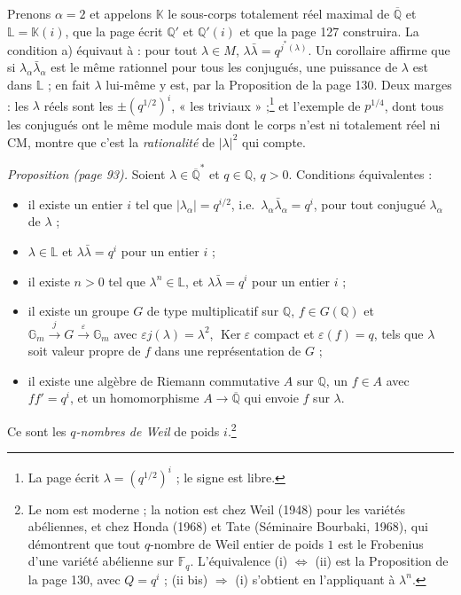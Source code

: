 \documentclass[11pt,a4paper]{article}
\begin{document}
Prenons $\alpha = 2$ et appelons $\mathbb{K}$ le sous-corps totalement réel
maximal de $\overline{\mathbb{Q}}$ et $\mathbb{L} = \mathbb{K}(i)$, que la page
écrit $\mathbb{Q}'$ et $\mathbb{Q}'(i)$ et que la page 127 construira. La
condition a) équivaut à : pour tout $\lambda \in M$, $\lambda\bar{\lambda} =
q^{j^{*}(\lambda)}$. Un corollaire affirme que si
$\lambda_{\alpha}\bar{\lambda}_{\alpha}$ est le même rationnel pour tous les
conjugués, une puissance de $\lambda$ est dans $\mathbb{L}$ ; en fait $\lambda$
lui-même y est, par la Proposition de la page 130. Deux marges : les $\lambda$
réels sont les $\pm (q^{1/2})^{i}$, « les triviaux » ;\footnote{La page écrit
$\lambda = (q^{1/2})^{i}$ ; le signe est libre.} et l'exemple de $p^{1/4}$,
dont tous les conjugués ont le même module mais dont le corps n'est ni
totalement réel ni CM, montre que c'est la \emph{rationalité} de
$|\lambda|^{2}$ qui compte.

\emph{Proposition (page 93).} Soient $\lambda \in \overline{\mathbb{Q}}^{*}$ et
$q \in \mathbb{Q}$, $q > 0$. Conditions équivalentes :
\begin{itemize}
  \item[(i)] il existe un entier $i$ tel que $|\lambda_{\alpha}| = q^{i/2}$, i.e.\
  $\lambda_{\alpha}\bar{\lambda}_{\alpha} = q^{i}$, pour tout conjugué
  $\lambda_{\alpha}$ de $\lambda$ ;
  \item[(ii)] $\lambda \in \mathbb{L}$ et $\lambda\bar{\lambda} = q^{i}$ pour un
  entier $i$ ;
  \item[(ii bis)] il existe $n > 0$ tel que $\lambda^{n} \in \mathbb{L}$, et
  $\lambda\bar{\lambda} = q^{i}$ pour un entier $i$ ;
  \item[(iii)] il existe un groupe $G$ de type multiplicatif sur $\mathbb{Q}$,
  $f \in G(\mathbb{Q})$ et $\mathbb{G}_{m} \xrightarrow{j} G
  \xrightarrow{\varepsilon} \mathbb{G}_{m}$ avec $\varepsilon j(\lambda) =
  \lambda^{2}$, $\operatorname{Ker}\varepsilon$ compact et $\varepsilon(f) = q$,
  tels que $\lambda$ soit valeur propre de $f$ dans une représentation de $G$ ;
  \item[(iv)] il existe une algèbre de Riemann commutative $A$ sur $\mathbb{Q}$,
  un $f \in A$ avec $ff' = q^{i}$, et un homomorphisme $A \to
  \overline{\mathbb{Q}}$ qui envoie $f$ sur $\lambda$.
\end{itemize}
Ce sont les \emph{$q$-nombres de Weil} de poids $i$.\footnote{Le nom est
moderne ; la notion est chez Weil (1948) pour les variétés abéliennes, et chez
Honda (1968) et Tate (Séminaire Bourbaki, 1968), qui démontrent que tout
$q$-nombre de Weil entier de poids $1$ est le Frobenius d'une variété abélienne
sur $\mathbb{F}_{q}$. L'équivalence (i) $\Leftrightarrow$ (ii) est la
Proposition de la page 130, avec $Q = q^{i}$ ; (ii bis) $\Rightarrow$ (i)
s'obtient en l'appliquant à $\lambda^{n}$.}
\end{document}
